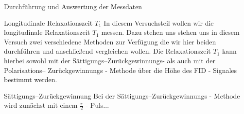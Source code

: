 \documentclass[pdftex, a4paper,11pt, twoside, ngerman]{report}
\begin{document}
\begin{chapter}{Durchführung und Auswertung der Messdaten}
    
    
    \begin{section}{
        Longitudinale Relaxationszeit $T_{1}$}
      \label{chpLongRelax}
      In diesem Versuchsteil wollen wir die longitudinale Relaxationszeit
      $T_{1}$ messen.
      Dazu stehen uns stehen uns in diesem Versuch zwei verschiedene Methoden
      zur Verfügung die wir hier beiden durchführen und anschließend
      vergleichen wollen.
      Die Relaxationszeit $T_{1}$ kann hierbei sowohl mit der
      Sättigungs--Zurückgewinnungs- als auch mit der Polarisations--
      Zurückgewinnungs - Methode über die Höhe des FID - Signales bestimmt werden.
      
      
      \begin{subsection}{Sättigungs--Zurückgewinnung}
        \label{chpLongRelaxSaettigung}
        Bei der Sättigungs--Zurückgewinnungs - Methode wird zunächst mit einem
        $\frac{\pi}{2}$ - Puls... 
        

\end{subsection}
\end{section}
\end{chapter}
\end{document}

